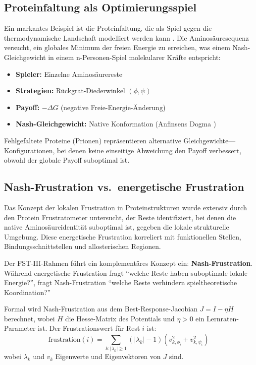 \documentclass[12pt,a4paper]{article}
\theoremstyle{remark}
\begin{document}
\subsection{Proteinfaltung als Optimierungsspiel}

Ein markantes Beispiel ist die Proteinfaltung, die als Spiel gegen die thermodynamische Landschaft modelliert werden kann \citep{EnzymeFolding}. Die Aminos\"auresequenz versucht, ein globales Minimum der freien Energie zu erreichen, was einem Nash-Gleichgewicht in einem n-Personen-Spiel molekularer Kr\"afte entspricht:

\begin{itemize}
    \item \textbf{Spieler:} Einzelne Aminos\"aurereste
    \item \textbf{Strategien:} R\"uckgrat-Diederwinkel $(\phi, \psi)$
    \item \textbf{Payoff:} $-\Delta G$ (negative Freie-Energie-\"Anderung)
    \item \textbf{Nash-Gleichgewicht:} Native Konformation (Anfinsens Dogma \citep{Anfinsen1973})
\end{itemize}

Fehlgefaltete Proteine (Prionen) repr\"asentieren alternative Gleichgewichte---Konfigurationen, bei denen keine einseitige Abweichung den Payoff verbessert, obwohl der globale Payoff suboptimal ist.

\subsection{Nash-Frustration vs.\ energetische Frustration}

Das Konzept der lokalen Frustration in Proteinstrukturen wurde extensiv durch den Protein Frustratometer \citep{Ferreiro2007,Ferreiro2014} untersucht, der Reste identifiziert, bei denen die native Aminos\"aureidentit\"at suboptimal ist, gegeben die lokale strukturelle Umgebung. Diese energetische Frustration korreliert mit funktionellen Stellen, Bindungsschnittstellen und allosterischen Regionen.

Der FST-III-Rahmen f\"uhrt ein komplement\"ares Konzept ein: \textbf{Nash-Frustration}. W\"ahrend energetische Frustration fragt ``welche Reste haben suboptimale lokale Energie?'', fragt Nash-Frustration ``welche Reste verhindern spieltheoretische Koordination?''

Formal wird Nash-Frustration aus dem Best-Response-Jacobian $J = I - \eta H$ berechnet, wobei $H$ die Hesse-Matrix des Potentials und $\eta > 0$ ein Lernraten-Parameter ist. Der Frustrationswert f\"ur Rest $i$ ist:
\begin{equation}
\text{frustration}(i) = \sum_{k: |\lambda_k| \geq 1} (|\lambda_k| - 1) \left( v_{k,\phi_i}^2 + v_{k,\psi_i}^2 \right)
\end{equation}
wobei $\lambda_k$ und $v_k$ Eigenwerte und Eigenvektoren von $J$ sind.
\end{document}
